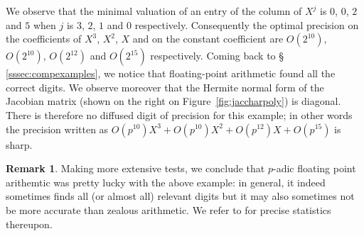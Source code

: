 \documentclass[11pt]{article}
\numberwithin{equation}{section}
\numberwithin{figure}{section}
\theoremstyle{definition}
\newtheorem{rem}[theo]{Remark}
\begin{document}
% 
We observe that the minimal valuation of an entry of the column of $X^j$ 
is $0$, $0$, $2$ and $5$ when $j$ is $3$, $2$, $1$ and $0$ respectively. 
Consequently the optimal precision on the coefficients of $X^3$, $X^2$, 
$X$ and on the constant coefficient are $O(2^{10})$, $O(2^{10})$, 
$O(2^{12})$ and $O(2^{15})$ respectively. Coming back to \S 
\ref{sssec:compexamples}, we notice that floating-point arithmetic
found all the correct digits.
We observe moreover that the Hermite normal form of the Jacobian matrix
(shown on the right on Figure~\ref{fig:jaccharpoly}) is diagonal. There
is therefore no diffused digit of precision for this example; in other
words the precision written as
$O(p^{10}) X^3 + O(p^{10}) X^2 + O(p^{12}) X + O(p^{15})$
is sharp.

\begin{rem}
Making more extensive tests, we conclude that $p$-adic floating point
arithemtic was pretty lucky with the above example: in general, it 
indeed sometimes finds all (or almost all) relevant digits but it may
also sometimes not be more accurate than zealous arithmetic. We refer
to \cite{CaRoVa17} for precise statistics thereupon.
\end{rem}
\end{document}
